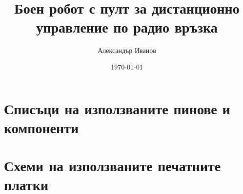 \documentclass{tu_coursework}
\title{Боен робот с пулт за дистанционно управление по радио връзка}
\author{Александър Иванов}
\date{\today}
\begin{document}

\maketitle
\cleardoublepage





\tableofcontents
\listoffigures
\listoftables
\lstlistoflistings













\appendix
\chapter{Списъци на използваните пинове и компоненти}


\chapter{Схеми на използваните печатните платки}


\nocite{combat-tutorial}
\nocite{battlebots-rules}
\nocite{pmos-article}
\nocite{optron-article}
\nocite{nRF24L01-datasheet}
\nocite{STM32F103C8-reference}
\nocite{STM32F103C8-datasheet}

\printbibliography
\end{document}
